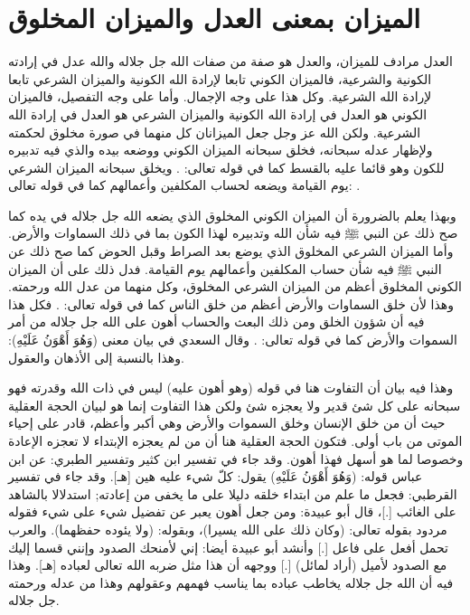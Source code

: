 \section{الميزان بمعنى العدل والميزان المخلوق}

 العدل مرادف للميزان، والعدل هو صفة من صفات الله جل جلاله والله عدل في إرادته الكونية والشرعية، فالميزان الكوني تابعا لإرادة الله الكونية والميزان الشرعي تابعا لإرادة الله الشرعية. وكل هذا على وجه الإجمال. وأما على وجه التفصيل، فالميزان الكوني هو العدل في إرادة الله الكونية والميزان الشرعي هو العدل في إرادة الله الشرعية. ولكن الله عز وجل جعل الميزانان كل منهما في صورة مخلوق لحكمته ولإظهار عدله سبحانه، فخلق سبحانه الميزان الكوني ووضعه بيده والذي فيه تدبيره للكون وهو قائما عليه بالقسط كما في قوله تعالى:
\quranayah*[3][18]{\footnotesize \surahname*[3]}. ويخلق سبحانه الميزان الشرعي يوم القيامة ويضعه لحساب المكلفين وأعمالهم كما في قوله تعالى: 
\quranayah*[21][47]{\footnotesize \surahname*[21]}.

وبهذا يعلم بالضرورة أن الميزان الكوني المخلوق الذي يضعه الله جل جلاله في يده كما صح ذلك عن النبي ﷺ فيه شأن الله وتدبيره لهذا الكون بما في ذلك السماوات والأرض. وأما الميزان الشرعي المخلوق الذي يوضع بعد الصراط وقبل الحوض كما صح ذلك عن النبي ﷺ فيه شأن حساب المكلفين وأعمالهم يوم القيامة. فدل ذلك على أن الميزان الكوني المخلوق أعظم من الميزان الشرعي المخلوق، وكل منهما من عدل الله ورحمته. وهذا لأن خلق السماوات والأرض أعظم من خلق الناس كما في قوله تعالى: 
\quranayah*[40][57]{\footnotesize \surahname*[40]}. فكل هذا فيه أن شؤون الخلق ومن ذلك البعث والحساب أهون على الله جل جلاله من أمر السموات والأرض كما في قوله تعالى: 
\quranayah*[30][27]{\footnotesize \surahname*[30]}. وقال السعدي في بيان معنى (وَهُوَ أَهْوَنُ عَلَيْهِ): وهذا بالنسبة إلى الأذهان والعقول.

وهذا فيه بيان أن التفاوت هنا في قوله (وهو أهون عليه) ليس في ذات الله وقدرته فهو سبحانه على كل شئ قدير ولا يعجزه شئ ولكن هذا التفاوت إنما هو لبيان الحجة العقلية حيث أن من خلق الإنسان وخلق السموات والأرض وهي أكبر وأعظم، قادر على إحياء الموتى من باب أولى. فتكون الحجة العقلية هنا أن من لم يعجزه الإبتداء لا تعجزه الإعادة وخصوصا لما هو أسهل فهذا أهون. وقد جاء في تفسير ابن كثير وتفسير الطبري: عن ابن عباس قوله: (وَهُوَ أَهْوَنُ عَلَيْهِ) يقول: كلّ شيء عليه هين [هـ]. وقد جاء في تفسير القرطبي: فجعل ما علم من ابتداء خلقه دليلا على ما يخفى من إعادته; استدلالا بالشاهد على الغائب  [.]، قال أبو عبيدة: ومن جعل أهون يعبر عن تفضيل شيء على شيء فقوله مردود بقوله تعالى: (وكان ذلك على الله يسيرا)، وبقوله: (ولا يئوده حفظهما). والعرب تحمل أفعل على فاعل [.] وأنشد أبو عبيدة أيضا: إني لأمنحك الصدود وإنني قسما إليك مع الصدود لأميل (أراد لمائل) [.] ووجهه أن هذا مثل ضربه الله تعالى لعباده [هـ]. وهذا فيه أن الله جل جلاله يخاطب عباده بما يناسب فهمهم وعقولهم وهذا من عدله ورحمته جل جلاله.


